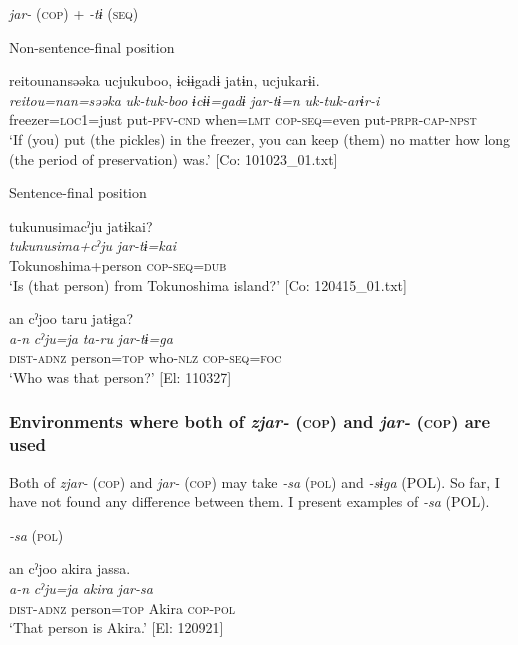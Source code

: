 \ea\label{ex:8-44}
  \textit{jar-} (\textsc{cop}) + \textit{-tɨ} (\textsc{seq})

  Non-sentence-final position

\ea  {\TM}
\glll  {\textbar}reitou{\textbar}nansəəka  ucjukuboo,  ɨcɨɨgadɨ  jatɨn,      ucjukarɨi.\\
\textit{reitou=nan=səəka}  \textit{uk-tuk-boo}  \textit{ɨcɨɨ=gadɨ}  \textit{jar-tɨ=n}      \textit{uk-tuk-arɨr-i}\\
freezer=\textsc{loc1}=just  put-\textsc{pfv}-\textsc{cnd}  when=\textsc{lmt}  \textsc{cop}-\textsc{seq}=even  put-\textsc{prpr}-\textsc{cap}-\textsc{npst}\\
\glt ‘If (you) put (the pickles) in the freezer, you can keep (them) no matter how long (the period of preservation) was.’ [Co: 101023\_01.txt]

  Sentence-final position


\ex
{\TM}
\glll  tukunusimacˀju  jatɨkai?\\
\textit{tukunusima+cˀju}  \textit{jar-tɨ=kai}\\
Tokunoshima+person  \textsc{cop}-\textsc{seq}=\textsc{dub}\\
\glt ‘Is (that person) from Tokunoshima island?’ [Co: 120415\_01.txt]


\ex  {\TM}
\glll  an  cˀjoo  taru  jatɨga?\\
\textit{a-n}  \textit{cˀju=ja}  \textit{ta-ru}  \textit{jar-tɨ=ga}\\
\textsc{dist}-\textsc{adnz}  person=\textsc{top}  who-\textsc{nlz}  \textsc{cop}-\textsc{seq}=\textsc{foc}\\
\glt ‘Who was that person?’ [El: 110327]
\z
\z

\subsubsection{Environments where both of \textit{zjar-} (\textsc{cop}) and \textit{jar-} (\textsc{cop}) are used}

Both of \textit{zjar-} (\textsc{cop}) and \textit{jar-} (\textsc{cop}) may take \textit{-sa} (\textsc{pol}) and \textit{-sɨga} (POL). So far, I have not found any difference between them. I present examples of \textit{-sa} (POL).

\ea\label{ex:8-45}
\textit{-sa} (\textsc{pol})

\ea
{\TM}
\glll  an  cˀjoo  akira  jassa.\\
\textit{a-n}  \textit{cˀju=ja}  \textit{akira}  \textit{jar-sa}\\
\textsc{dist}-\textsc{adnz}  person=\textsc{top}  Akira  \textsc{cop}-\textsc{pol}\\
\glt ‘That person is Akira.’ [El: 120921]


